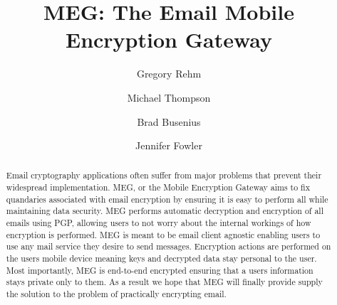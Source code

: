 \documentclass[10pt]{article}
\begin{document}
\title{MEG: The Email Mobile Encryption Gateway}

\author{Gregory Rehm} \author{Michael Thompson} \author{Brad Busenius} \author{Jennifer Fowler}


\maketitle

\begin{abstract}
\par Email cryptography applications often suffer from major problems that prevent their widespread implementation. MEG, or the Mobile Encryption Gateway aims to fix quandaries associated with email encryption by ensuring it is easy to perform all while maintaining data security. MEG performs automatic decryption and encryption of all emails using PGP, allowing users to not worry about the internal workings of how encryption is performed. MEG is meant to be email client agnostic enabling users to use any mail service they desire to send messages. Encryption actions are performed on the users mobile device meaning keys and decrypted data stay personal to the user. Most importantly, MEG is end-to-end encrypted ensuring that a users information stays private only to them. As a result we hope that MEG will finally provide supply the solution to the problem of practically encrypting email.
\end{abstract}
\end{document}
